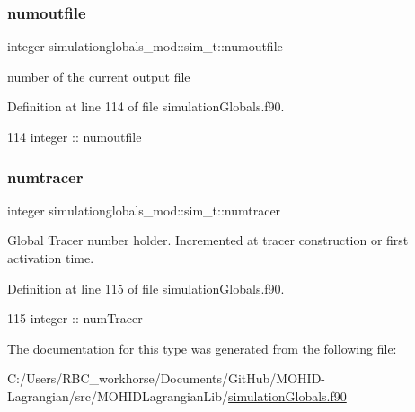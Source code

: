 \subsubsection{\texorpdfstring{numoutfile}{numoutfile}}
{\footnotesize\ttfamily integer simulationglobals\+\_\+mod\+::sim\+\_\+t\+::numoutfile\hspace{0.3cm}{\ttfamily [private]}}



number of the current output file 



Definition at line 114 of file simulation\+Globals.\+f90.


\begin{DoxyCode}
114         \textcolor{keywordtype}{integer} :: numoutfile
\end{DoxyCode}
\mbox{\label{structsimulationglobals__mod_1_1sim__t_a23cc2df1e0cf56990759076ed07b69f1}} 
\subsubsection{\texorpdfstring{numtracer}{numtracer}}
{\footnotesize\ttfamily integer simulationglobals\+\_\+mod\+::sim\+\_\+t\+::numtracer\hspace{0.3cm}{\ttfamily [private]}}



Global Tracer number holder. Incremented at tracer construction or first activation time. 



Definition at line 115 of file simulation\+Globals.\+f90.


\begin{DoxyCode}
115         \textcolor{keywordtype}{integer} :: numTracer
\end{DoxyCode}


The documentation for this type was generated from the following file\+:\begin{DoxyCompactItemize}
\item 
C\+:/\+Users/\+R\+B\+C\+\_\+workhorse/\+Documents/\+Git\+Hub/\+M\+O\+H\+I\+D-\/\+Lagrangian/src/\+M\+O\+H\+I\+D\+Lagrangian\+Lib/\mbox{\hyperlink{simulation_globals_8f90}{simulation\+Globals.\+f90}}\end{DoxyCompactItemize}
